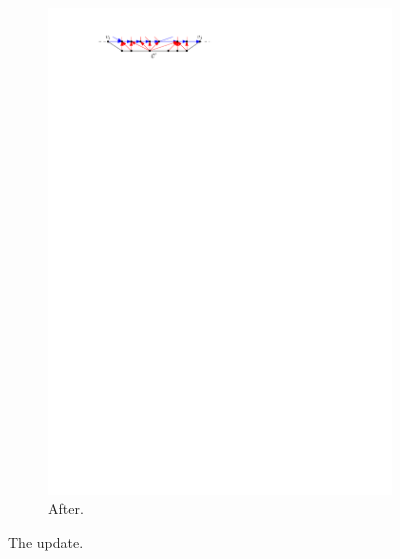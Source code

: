 \begin{figure}[t]
\begin{subfigure}[b]{0.45 \textwidth}
          \includegraphics[width =\textwidth]{unifiedAlgo/img/sweep/updateAfter.pdf}
          \caption{After.}
      \end{subfigure}
      	\caption{The update.}
  \label{fig:sweep:update}
  \end{figure}


